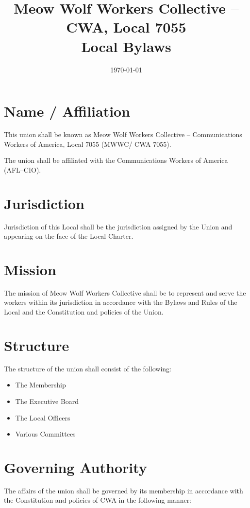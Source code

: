 \documentclass[11pt]{article}
\title{Meow Wolf Workers Collective \--- CWA, Local 7055 \\ Local Bylaws}
\date{\today}
\begin{document}
\maketitle

\tableofcontents
{}
\newpage
\section{Name / Affiliation}
This union shall be known as Meow Wolf Workers Collective – Communications Workers of America, Local 7055 (MWWC/ CWA 7055).

The union shall be affiliated with the Communications Workers of America (AFL–CIO).

\section{Jurisdiction}
Jurisdiction of this Local shall be the jurisdiction assigned by the Union and appearing on the face of the Local Charter.

\section{Mission}
The mission of Meow Wolf Workers Collective shall be to represent and serve the workers within its jurisdiction in accordance with the Bylaws and Rules of the Local and the Constitution and policies of the Union.

\section{Structure}
The structure of the union shall consist of the following:

\begin{itemize}
\item The Membership
\item The Executive Board
\item The Local Officers
\item Various Committees
\end{itemize}

\section{Governing Authority}

The affairs of the union shall be governed by its membership in accordance with the Constitution and policies of CWA in the following manner:
\end{document}
